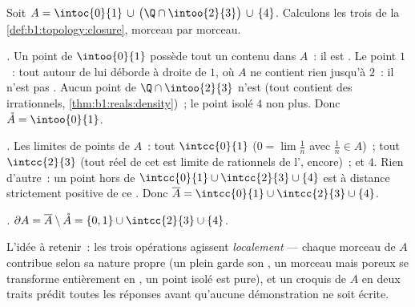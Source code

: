 \begin{example}\label{ex:b1:topology:anatomy}
Soit $A = \intoc{0}{1} \,\cup\, \bigl(\Q \cap \intoo{2}{3}\bigr)
\,\cup\, \{4\}$. Calculons les trois  de
la \cref{def:b1:topology:closure}, morceau par morceau.

\emph{.} Un point de $\intoo{0}{1}$ possède tout un
 contenu dans $A$~: il est . Le point $1$~:
tout  autour de lui déborde à droite de $1$, où $A$ ne
contient rien jusqu'à $2$~: il n'est pas . Aucun point de
$\Q \cap \intoo{2}{3}$ n'est  (tout  contient
des irrationnels, \cref{thm:b1:reals:density})~; le point isolé
$4$ non plus. Donc $\mathring A = \intoo{0}{1}$.

\emph{.} Les limites de points de $A$~: tout
$\intcc{0}{1}$ ($0 = \lim \frac1n$ avec $\frac 1n \in A$)~; tout
$\intcc{2}{3}$ (tout réel de cet  est limite de
rationnels de l',  encore)~; et $4$. Rien
d'autre~: un point hors de $\intcc{0}{1} \cup \intcc{2}{3} \cup
\{4\}$ est à distance strictement positive de ce . Donc
$\overline A = \intcc{0}{1} \cup \intcc{2}{3} \cup \{4\}$.

\emph{.} $\partial A = \overline A \setminus \mathring A
= \{0, 1\} \cup \intcc{2}{3} \cup \{4\}$.

L'idée à retenir~: les trois opérations agissent \emph{localement}
--- chaque morceau de $A$ contribue selon sa nature propre (un
 plein garde son , un morceau  mais poreux
se transforme entièrement en , un point isolé est
 pure), et un croquis de $A$ en deux traits prédit toutes
les réponses avant qu'aucune démonstration ne soit écrite.
\end{example}

